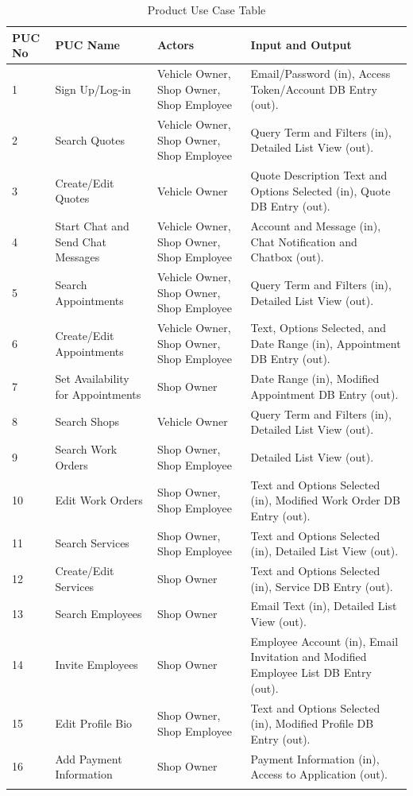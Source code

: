 \documentclass[12pt]{article}
\begin{document}
\renewcommand{\arraystretch}{1.2}
\begin{longtable}{p{1cm}p{3cm}p{4cm}p{6cm}}
    \toprule
    \textbf{PUC No} & \textbf{PUC Name} & \textbf{Actors} & \textbf{Input and Output} \\
    \midrule
    1 & Sign Up/Log-in & Vehicle Owner, Shop Owner, Shop Employee & Email/Password (in), Access Token/Account DB Entry (out).\\
    2 & Search Quotes & Vehicle Owner, Shop Owner, Shop Employee & Query Term and Filters (in), Detailed List View (out).\\
    3 & Create/Edit Quotes & Vehicle Owner & Quote Description Text and Options Selected (in), Quote DB Entry (out).\\
    4 & Start Chat and Send Chat Messages & Vehicle Owner, Shop Owner, Shop Employee & Account and Message (in), Chat Notification and Chatbox (out).\\
    5 & Search Appointments & Vehicle Owner, Shop Owner, Shop Employee & Query Term and Filters (in), Detailed List View (out).\\
    6 & Create/Edit Appointments & Vehicle Owner, Shop Owner, Shop Employee & Text, Options Selected, and Date Range (in), Appointment DB Entry (out).\\
    7 & Set Availability for Appointments & Shop Owner & Date Range (in), Modified Appointment DB  Entry (out).\\
    8 & Search Shops & Vehicle Owner & Query Term and Filters (in), Detailed List View (out).\\
    9 & Search Work Orders & Shop Owner, Shop Employee & Detailed List View (out).\\
    10 & Edit Work Orders & Shop Owner, Shop Employee & Text and Options Selected (in), Modified Work Order DB Entry (out).\\
    11 & Search Services & Shop Owner, Shop Employee & Text and Options Selected (in), Detailed List View (out).\\
    12 & Create/Edit Services & Shop Owner & Text and Options Selected (in), Service DB Entry (out).\\
    13 & Search Employees & Shop Owner & Email Text (in), Detailed List View (out).\\
    14 & Invite Employees & Shop Owner & Employee Account (in), Email Invitation and Modified Employee List DB Entry (out).\\
    15 & Edit Profile Bio & Shop Owner, Shop Employee & Text and Options Selected (in), Modified Profile DB Entry (out).\\
    16 & Add Payment Information & Shop Owner & Payment Information (in), Access to Application (out).\\
    \bottomrule
    \caption{Product Use Case Table}
\end{longtable}
\end{document}
